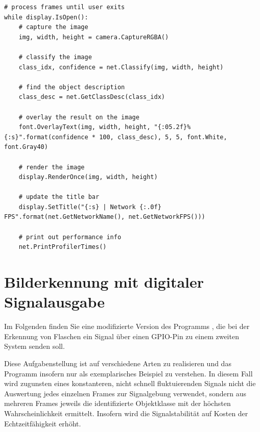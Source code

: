 \begin{lstlisting}
# process frames until user exits
while display.IsOpen():
	# capture the image
	img, width, height = camera.CaptureRGBA()

	# classify the image
	class_idx, confidence = net.Classify(img, width, height)

	# find the object description
	class_desc = net.GetClassDesc(class_idx)

	# overlay the result on the image	
	font.OverlayText(img, width, height, "{:05.2f}% {:s}".format(confidence * 100, class_desc), 5, 5, font.White, font.Gray40)

	# render the image
	display.RenderOnce(img, width, height)

	# update the title bar
	display.SetTitle("{:s} | Network {:.0f} FPS".format(net.GetNetworkName(), net.GetNetworkFPS()))

	# print out performance info
	net.PrintProfilerTimes()

\end{lstlisting}

\section{Bilderkennung mit digitaler Signalausgabe}

Im Folgenden finden Sie eine modifizierte Version des Programms ,
die bei der Erkennung von Flaschen ein Signal über einen GPIO-Pin zu einem zweiten System senden soll.

\medskip

Diese Aufgabenstellung ist auf verschiedene Arten zu realisieren und das Programm insofern nur als exemplarisches Beispiel zu verstehen. In diesem Fall wird zugunsten eines konstanteren, nicht schnell fluktuierenden Signals nicht die Auswertung jedes einzelnen Frames zur Signalgebung verwendet, sondern aus mehreren Frames jeweils die identifizierte Objektklasse mit der höchsten Wahrscheinlichkeit ermittelt. Insofern wird die Signalstabilität auf Kosten der Echtzeitfähigkeit erhöht.

\medskip

